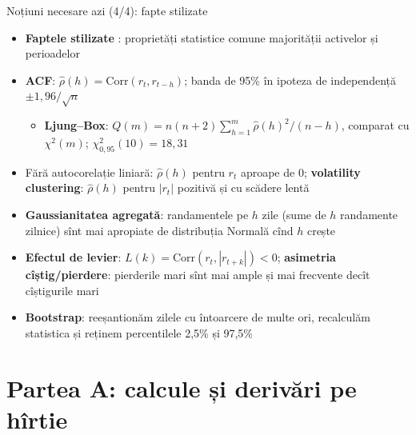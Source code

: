 \begin{frame}{Noțiuni necesare azi (4/4): fapte stilizate}
\itemsize{\footnotesize}
\begin{itemize}
    \item \textbf{Faptele stilizate} : proprietăți statistice comune majorității activelor și perioadelor
    \item \textbf{ACF}: $\hat\rho(h) = \text{Corr}(r_t, r_{t-h})$; banda de 95\% în ipoteza de independență $\pm 1{,}96/\sqrt n$
    \begin{itemize}
        \item \textbf{Ljung--Box}: $Q(m) = n(n+2)\sum_{h=1}^m \hat\rho(h)^2/(n-h)$, comparat cu $\chi^2(m)$; $\chi^2_{0{,}95}(10) = 18{,}31$
    \end{itemize}
    \item Fără autocorelație liniară: $\hat\rho(h)$ pentru $r_t$ aproape de 0; \textbf{volatility clustering}: $\hat\rho(h)$ pentru $|r_t|$ pozitivă și cu scădere lentă
    \item \textbf{Gaussianitatea agregată}: randamentele pe $h$ zile (sume de $h$ randamente zilnice) sînt mai apropiate de distribuția Normală cînd $h$ crește
    \item \textbf{Efectul de levier}: $L(k) = \text{Corr}(r_t, |r_{t+k}|) < 0$; \textbf{asimetria cîștig/pierdere}: pierderile mari sînt mai ample și mai frecvente decît cîștigurile mari
    \item \textbf{Bootstrap}: reeșantionăm zilele cu întoarcere de multe ori, recalculăm statistica și reținem percentilele 2,5\% și 97,5\%
\end{itemize}
\end{frame}


\section{Partea A: calcule și derivări pe hîrtie}

